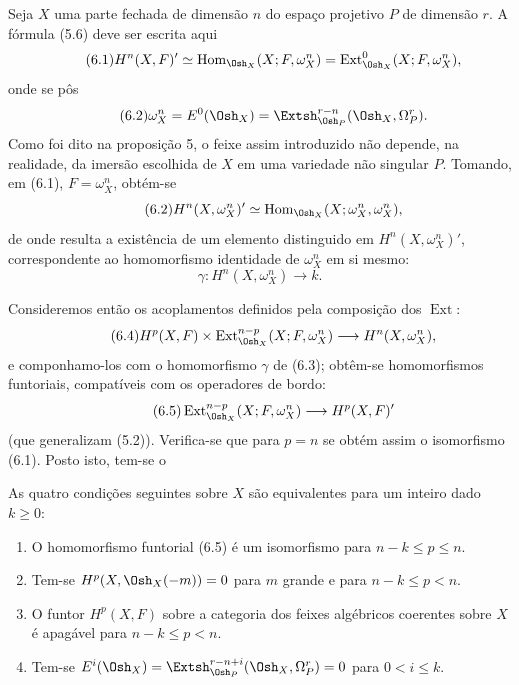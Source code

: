 
Seja $X$ uma parte fechada de dimensão $n$ do espaço projetivo $P$ de
dimensão $r$. A fórmula (5.6) deve ser escrita aqui
\begin{equation}\tag{6.1}
  H^{n}(X,F)'
  \simeq\operatorname{Hom}_{\Osh_X}(X;F,\omega_X^{n})
  =\operatorname{Ext}_{\Osh_X}^{0}(X;F,\omega_X^{n}),
\end{equation}
onde se pôs
\begin{equation}\tag{6.2}
  \omega_X^{n}=E^{0}(\Osh_X)
  =\Extsh_{\Osh_P}^{r-n}(\Osh_X,\Omega_P^{r}).
\end{equation}
Como foi dito na proposição 5, o feixe assim introduzido não depende,
na realidade, da imersão escolhida de $X$ em uma variedade não singular $P$.
Tomando, em (6.1), $F=\omega_X^{n}$, obtém-se
\begin{equation}\tag{6.2}
  H^{n}(X,\omega_X^{n})'
  \simeq\operatorname{Hom}_{\Osh_X}(X;\omega_X^{n},\omega_X^{n}),
\end{equation}
 de onde
resulta a existência de um elemento
distinguido em $H^{n}(X,\omega_X^{n})'$, correspondente ao homomorfismo
identidade de $\omega_X^{n}$ em si mesmo:
\begin{equation}\tag{6.3}
  \gamma:H^{n}(X,\omega_X^{n})\longrightarrow k.
\end{equation}

Consideremos então os acoplamentos definidos pela composição dos $\operatorname{Ext}$:
\begin{equation}\tag{6.4}
  H^{p}(X,F)\times
  \operatorname{Ext}_{\Osh_X}^{n-p}(X;F,\omega_X^{n})
  \longrightarrow H^{n}(X,\omega_X^{n}),
\end{equation}
e componhamo-los com o homomorfismo $\gamma$ de (6.3); obtêm-se
homomorfismos funtoriais, compatíveis com os operadores de bordo:
\begin{equation}\tag{6.5}
  \operatorname{Ext}_{\Osh_X}^{n-p}(X;F,\omega_X^{n})
  \longrightarrow H^{p}(X,F)'
\end{equation}
(que generalizam (5.2)). Verifica-se que para $p=n$ se obtém assim
o isomorfismo (6.1). Posto isto, tem-se o

 As quatro condições seguintes sobre $X$ são
equivalentes para um inteiro dado $k\geq0$:
\begin{enumerate}
  \item[\textit{i.}] O homomorfismo funtorial (6.5) é um isomorfismo para
    $n-k\leq p\leq n$.
  \item[\textit{ii.}] Tem-se $H^{p}(X,\Osh_X(-m))=0$ para $m$ grande e para
    $n-k\leq p<n$.
  \item[\textit{iii.}] O funtor $H^{p}(X,F)$ sobre a categoria dos feixes
    algébricos coerentes sobre $X$ é apagável para $n-k\leq p<n$.
  \item[\textit{iv.}] Tem-se
    $E^{i}(\Osh_X)=\Extsh_{\Osh_P}^{r-n+i}(\Osh_X,\Omega_P^{r})=0$
    para $0<i\leq k$.
\end{enumerate}

